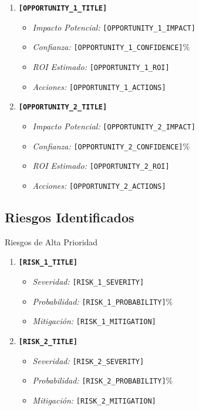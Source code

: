 \documentclass[12pt,a4paper]{article}
\begin{document}
\begin{enumerate}
    \item \textbf{\texttt{[OPPORTUNITY\_1\_TITLE]}}
    \begin{itemize}
        \item \textit{Impacto Potencial:} \texttt{[OPPORTUNITY\_1\_IMPACT]}
        \item \textit{Confianza:} \texttt{[OPPORTUNITY\_1\_CONFIDENCE]}\%
        \item \textit{ROI Estimado:} \texttt{[OPPORTUNITY\_1\_ROI]}
        \item \textit{Acciones:} \texttt{[OPPORTUNITY\_1\_ACTIONS]}
    \end{itemize}
    
    \item \textbf{\texttt{[OPPORTUNITY\_2\_TITLE]}}
    \begin{itemize}
        \item \textit{Impacto Potencial:} \texttt{[OPPORTUNITY\_2\_IMPACT]}
        \item \textit{Confianza:} \texttt{[OPPORTUNITY\_2\_CONFIDENCE]}\%
        \item \textit{ROI Estimado:} \texttt{[OPPORTUNITY\_2\_ROI]}
        \item \textit{Acciones:} \texttt{[OPPORTUNITY\_2\_ACTIONS]}
    \end{itemize}
\end{enumerate}

\subsection{Riesgos Identificados}

\begin{warningbox}{Riesgos de Alta Prioridad}
\begin{enumerate}
    \item \textbf{\texttt{[RISK\_1\_TITLE]}}
    \begin{itemize}
        \item \textit{Severidad:} \texttt{[RISK\_1\_SEVERITY]}
        \item \textit{Probabilidad:} \texttt{[RISK\_1\_PROBABILITY]}\%
        \item \textit{Mitigación:} \texttt{[RISK\_1\_MITIGATION]}
    \end{itemize}
    
    \item \textbf{\texttt{[RISK\_2\_TITLE]}}
    \begin{itemize}
        \item \textit{Severidad:} \texttt{[RISK\_2\_SEVERITY]}
        \item \textit{Probabilidad:} \texttt{[RISK\_2\_PROBABILITY]}\%
        \item \textit{Mitigación:} \texttt{[RISK\_2\_MITIGATION]}
    \end{itemize}
\end{enumerate}
\end{warningbox}
\end{document}
